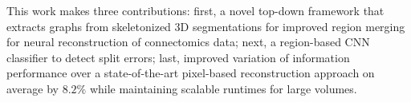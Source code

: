 This work makes three contributions:
first, a novel top-down framework that extracts graphs from skeletonized 3D segmentations for improved region merging for neural reconstruction of connectomics data; 
next, a region-based CNN classifier to detect split errors; 
last, improved variation of information performance over a state-of-the-art pixel-based reconstruction approach on average by $8.2\%$ while maintaining scalable runtimes for large volumes.
